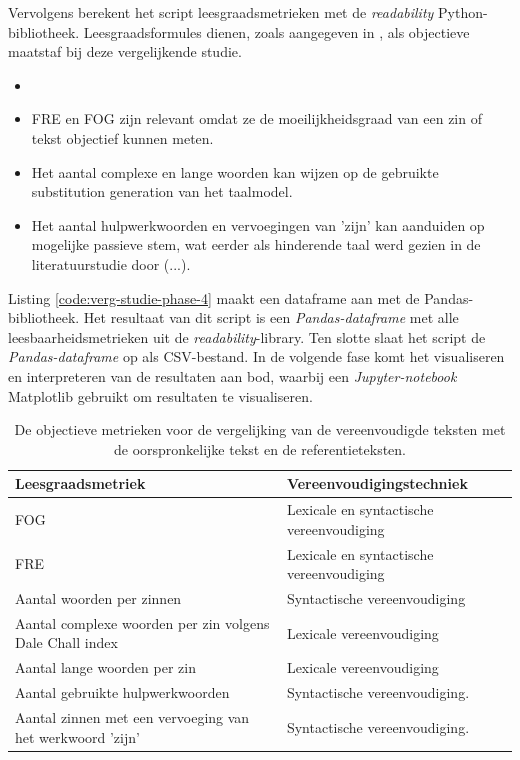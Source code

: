 Vervolgens berekent het script leesgraadsmetrieken met de \textit{readability} Python-bibliotheek. Leesgraadsformules dienen, zoals aangegeven in \textcite{Nenkova2004}, als objectieve maatstaf bij deze vergelijkende studie. 

\begin{itemize}
	\item 
	\item FRE en FOG zijn relevant omdat ze de moeilijkheidsgraad van een zin of tekst objectief kunnen meten.
	\item Het aantal complexe en lange woorden kan wijzen op de gebruikte substitution generation van het taalmodel.
	\item Het aantal hulpwerkwoorden en vervoegingen van 'zijn' kan aanduiden op mogelijke passieve stem, wat eerder als hinderende taal werd gezien in de literatuurstudie door (...).
\end{itemize}




Listing \ref{code:verg-studie-phase-4} maakt een dataframe aan met de Pandas-bibliotheek. Het resultaat van dit script is een \textit{Pandas-dataframe} met alle leesbaarheidsmetrieken uit de \textit{readability}-library. Ten slotte slaat het script de \textit{Pandas-dataframe} op als CSV-bestand. In de volgende fase komt het visualiseren en interpreteren van de resultaten aan bod, waarbij een \textit{Jupyter-notebook} Matplotlib gebruikt om resultaten te visualiseren.

\begin{center}
	\begin{table}[H]
		\begin{tabular}{ | m{8cm} | m{7cm} | } 
			\hline
			\textbf{Leesgraadsmetriek} & \textbf{Vereenvoudigingstechniek }\\
			\hline
			FOG & Lexicale en syntactische vereenvoudiging \\
			\hline
			FRE & Lexicale en syntactische vereenvoudiging \\
			\hline
			Aantal woorden per zinnen & Syntactische vereenvoudiging \\
			\hline
			Aantal complexe woorden per zin volgens Dale Chall index & Lexicale vereenvoudiging \\
			\hline
			Aantal lange woorden per zin & Lexicale vereenvoudiging \\
			\hline
			Aantal gebruikte hulpwerkwoorden & Syntactische vereenvoudiging. \\
			\hline
			Aantal zinnen met een vervoeging van het werkwoord 'zijn' & Syntactische vereenvoudiging. \\
			\hline
		\end{tabular}
		\caption{De objectieve metrieken voor de vergelijking van de vereenvoudigde teksten met de oorspronkelijke tekst en de referentieteksten.}
		\label{table:verg-studie-metrieken}
	\end{table}
\end{center}

